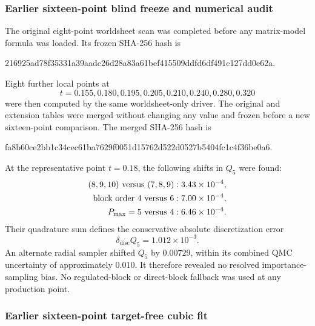 \documentclass[11pt]{article}
\begin{document}
\subsubsection{Earlier sixteen-point blind freeze and numerical audit}

\begin{samepage}
The original eight-point worldsheet scan was completed before any
matrix-model formula was loaded.  Its frozen SHA-256 hash is
\begin{center}
\small\ttfamily
216925ad78f35331a39aadc26d28a83a61bef415509ddfd6df491c127dd0e62a.
\end{center}
\end{samepage}
Eight further local points at
\begin{equation}
 t=0.155,0.180,0.195,0.205,0.210,0.240,0.280,0.320
\end{equation}
were then computed by the same worldsheet-only driver.  The original and
extension tables were merged without changing any value and frozen before a
new sixteen-point comparison.  The merged SHA-256 hash is
\begin{center}
\small\ttfamily
fa8b60ce2bb1c34cec61ba7629f0051d15762d522d0527b5404fc1c4f36be0a6.
\end{center}
At the representative point $t=0.18$, the following shifts in $Q_5$ were
found:
\begin{align}
  (8,9,10)\ \hbox{versus}\ (7,8,9)
    &: 3.43\times10^{-4},\\
  \hbox{block order }4\ \hbox{versus}\ 6
    &: 7.00\times10^{-4},\\
  P_{\max}=5\ \hbox{versus}\ 4
    &: 6.46\times10^{-4}.
\end{align}
Their quadrature sum defines the conservative absolute discretization error
\begin{equation}
  \delta_{\mathrm{disc}}Q_5=1.012\times10^{-3}.
  \label{eq:Q5-discretization}
\end{equation}
An alternate radial sampler shifted $Q_5$ by $0.00729$, within its combined
QMC uncertainty of approximately $0.010$.  It therefore revealed no resolved
importance-sampling bias.  No regulated-block or direct-block fallback was
used at any production point.

\subsubsection{Earlier sixteen-point target-free cubic fit}
\end{document}
